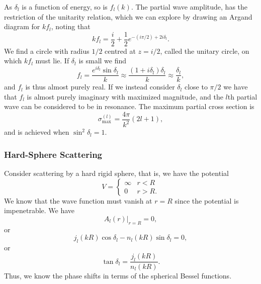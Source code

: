 As $\delta_l$ is a function of energy, so is $f_l(k)$. The partial wave amplitude, has the restriction of the unitarity relation, which we can explore by drawing an Argand diagram for $kf_l$, noting that
\begin{equation}
    k f_l = \frac{i}{2} + \frac{1}{2} e^{-(i\pi/2) + 2 i \delta_l}.
\end{equation}
We find a circle with radius $1/2$ centred at $z=i/2$, called the unitary circle, on which $kf_l$ must lie. If $\delta_l$ is small we find
\begin{equation}
    f_l = \frac{e^{i\delta_l}\sin\delta_l}{k} \approx \frac{(1+i\delta_l)\delta_l}{k} \approx \frac{\delta_l}{k},
\end{equation}
and $f_l$ is thus almost purely real. If we instead consider $\delta_l$ close to $\pi/2$ we have that $f_l$ is almost purely imaginary with maximized magnitude, and the $l$th partial wave can be considered to be in resonance. The maximum partial cross section is
\begin{equation}
    \sigma_\text{max}^{(l)} = \frac{4\pi}{k^2} (2l+1),
\end{equation}
and is achieved when $\sin^2\delta_l = 1$.

\subsubsection{Hard-Sphere Scattering}
Consider scattering by a hard rigid sphere, that is, we have the potential
\begin{equation}
    V = 
    \begin{cases}
        \infty  & r < R\\
        0       & r > R.    
    \end{cases}
\end{equation}
We know that the wave function must vanish at $r=R$ since the potential is impenetrable. We have
\begin{equation}
    A_l(r) |_{r=R} = 0,
\end{equation}
or 
\begin{equation}
    j_l (kR)\cos\delta_l - n_l(kR)\sin\delta_l = 0,
\end{equation}
or
\begin{equation}
    \tan\delta_l = \frac{j_l(kR)}{n_l(kR)}.
\end{equation}
Thus, we know the phase shifts in terms of the spherical Bessel functions.

